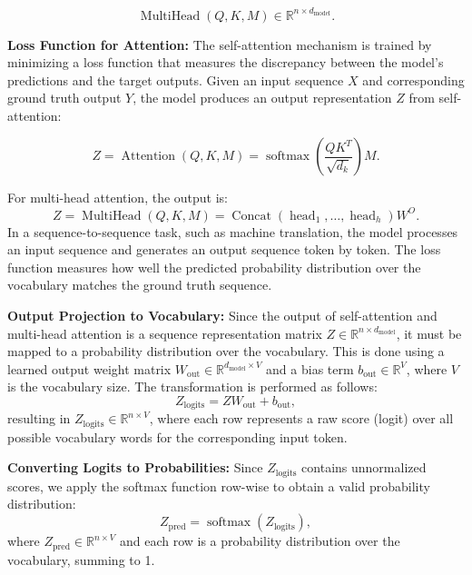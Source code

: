 \[
\operatorname{MultiHead}(Q, K, M) \in \mathbb{R}^{n \times d_{\text{model}}}.
\]

%
{\bf Loss Function for Attention:} The self-attention mechanism is trained by minimizing a loss function that measures the discrepancy between the model's predictions and the target outputs. Given an input sequence \( X \) and corresponding ground truth output \( Y \), the model produces an output representation \( Z \) from self-attention:

\[
Z = \operatorname{Attention}(Q, K, M) = \operatorname{softmax} \left( \frac{Q K^T}{\sqrt{d_k}} \right) M.
\]

For multi-head attention, the output is:
\[
Z = \operatorname{MultiHead}(Q, K, M) = \operatorname{Concat}(\operatorname{head}_1, \dots, \operatorname{head}_h) W^O.
\]
In a sequence-to-sequence task, such as machine translation, the model processes an input sequence and generates an output sequence token by token. The loss function measures how well the predicted probability distribution over the vocabulary matches the ground truth sequence.

%
{\bf Output Projection to Vocabulary:} Since the output of self-attention and multi-head attention is a sequence representation matrix \( Z \in \mathbb{R}^{n \times d_{\text{model}}} \), it must be mapped to a probability distribution over the vocabulary. This is done using a learned output weight matrix \( W_{\text{out}} \in \mathbb{R}^{d_{\text{model}} \times V} \) and a bias term \( b_{\text{out}} \in \mathbb{R}^{V} \), where \( V \) is the vocabulary size. The transformation is performed as follows:
\[
Z_{\text{logits}} = Z W_{\text{out}} + b_{\text{out}},
\]
resulting in \( Z_{\text{logits}} \in \mathbb{R}^{n \times V} \), where each row represents a raw score (logit) over all possible vocabulary words for the corresponding input token.

{\bf Converting Logits to Probabilities:} Since \( Z_{\text{logits}} \) contains unnormalized scores, we apply the softmax function row-wise to obtain a valid probability distribution:
\[
Z_{\text{pred}} = \operatorname{softmax}(Z_{\text{logits}}),
\]
where \( Z_{\text{pred}} \in \mathbb{R}^{n \times V} \) and each row is a probability distribution over the vocabulary, summing to 1.

